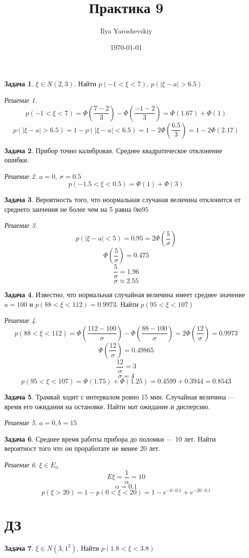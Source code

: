 \documentclass[english]{article}
\author{Ilya Yaroshevskiy}
\date{\today}
\title{Практика 9}
\theoremstyle{plain}
\theoremstyle{remark}
\newtheorem*{solution}{Решение}
\theoremstyle{definition}
\newtheorem{task}{Задача}
\begin{document}
\maketitle
\tableofcontents

\begin{task}
\(\xi \in N(2, 3)\). Найти \(p(-1 < \xi < 7)\), \(p(|\xi - a| > 6.5)\)
\end{task}
\begin{solution}
\[ p(-1 < \xi < 7) = \Phi\left(\frac{7 - 2}{3}\right) - \Phi\left(\frac{-1 - 2}{3}\right) = \Phi(1.67) + \Phi(1) \]
\[ p(|\xi - a| > 6.5) = 1 - p(|\xi - a| < 6.5) = 1 - 2\Phi \left(\frac{6.5}{3}\right) = 1 - 2\Phi(2.17) \]
\end{solution}
\begin{task}
Прибор точно калиброван. Среднее квадратическое отклонение ошибки.
\end{task}
\begin{solution}
\(a = 0,\ \sigma = 0.5\)
\[ p(-1.5 < \xi < 0.5) = \Phi(1)  + \Phi(3) \]
\end{solution}
\begin{task}
Вероятность того, что ноормальная случаная величина отклонится от среднего занчения не более чем на 5 равна \(0ю95\)
\end{task}
\begin{solution}
\[ p(|\xi - a| < 5) = 0.95 = 2\Phi \left(\frac{5}{\sigma}\right) \]
\[ \Phi \left(\frac{5}{\sigma}\right) = 0.475 \]
\[ \frac{5}{\sigma} = 1.96 \]
\[ \sigma \approx 2.55 \]
\end{solution}
\begin{task}
Известно, что нормальная случайная величина имеет среднее значение \(a = 100\) и \(p(88 < \xi < 112) = 0.9973\). Найти \(p(95 < \xi < 107)\)
\end{task}
\begin{solution}
\[ p(88 < \xi < 112) = \Phi \left(\frac{112 - 100}{\sigma}\right) - \Phi \left(\frac{88 - 100}{\sigma}\right) = 2\Phi \left(\frac{12}{\sigma}\right) = 0.9973 \]
\[ \Phi \left(\frac{12}{\sigma}\right) = 0.49865 \]
\[ \frac{12}{\sigma} = 3 \]
\[ \sigma = 4 \]
\[ p(95 < \xi < 107) = \Phi(1.75) + \Phi(1.25) = 0.4599 + 0.3944 = 0.8543 \]
\end{solution}
\begin{task}
Трамвай ходит с интервалом ровно 15 мин. Случайная величина --- время его ожидания на остановке. Найти мат ожидание и дисперсию.
\end{task}
\begin{solution}
\(a = 0, b = 15\)
\end{solution}
\begin{task}
Среднее время работы прибора до поломки --- 10 лет. Найти вероятност того что он проработате не менее 20 лет.
\end{task}
\begin{solution}
\(\xi \in E_\alpha\)
\[ E\xi = \frac{1}{\alpha} = 10 \]
\[ \alpha = 0.1 \]
\[ p(\xi > 20) = 1 - p(0 < \xi < 20) = 1 - e^{-0\cdot0.1}  + e^{-20\cdot 0.1}\]
\end{solution}

\section{ДЗ}
\label{sec:org0d557fd}
\begin{task}
\(\xi \in N(3, 1^2)\). Найти \(p(1.8 < \xi < 3.8)\)
\end{task}
\end{document}
